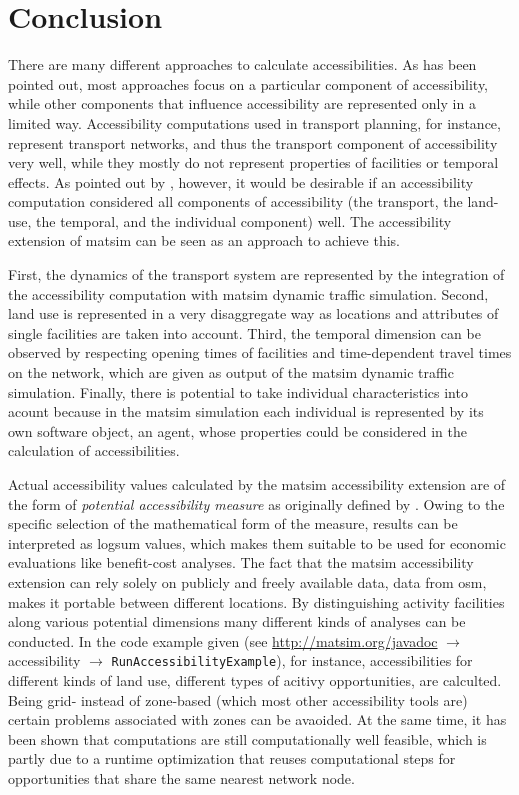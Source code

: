 \section{Conclusion}
There are many different approaches to calculate accessibilities. As has been pointed out, most approaches focus
on a particular component of accessibility, while other components that influence accessibility are 
represented only in a limited way. Accessibility computations used in transport planning, for instance, represent 
transport networks, and thus the transport component of accessibility very well, while they mostly do not represent
properties of facilities or temporal effects. As pointed out by \citet{Geurs2004AccessibilityReview}, however, it
would be desirable if an accessibility computation considered all components of accessibility (\ie the transport, 
the land-use, the temporal, and the individual component) well. The accessibility extension of \gls{matsim} can 
be seen as an approach to achieve this. 

First, the dynamics of the transport system are represented by the integration of the accessibility 
computation with \gls{matsim} dynamic traffic simulation. 
Second, land use is represented in a very disaggregate way as locations and attributes of single facilities are
taken into account.
Third, the temporal dimension can be observed by respecting opening times of facilities and time-dependent
travel times on the network, which are given as output of the \gls{matsim} dynamic traffic simulation.
Finally, there is potential to take individual characteristics into acount because in the \gls{matsim} simulation 
each individual is represented by its own software object, \ie an agent, whose properties could be
considered in the calculation of accessibilities.

Actual accessibility values calculated by the \gls{matsim} accessibility extension are of the form of 
\textit{potential accessibility measure} as originally defined by \citet{Hansen1959HowAccessibilityShapesLandUse}.
Owing to the specific selection of the mathematical form of the measure, results can be interpreted as 
\gls{logsum} values, which makes them suitable to be used for economic evaluations like benefit-cost analyses.
The fact that the \gls{matsim} accessibility extension can rely solely on publicly and freely available 
data, \eg data from \gls{osm}, makes it portable between different locations. By distinguishing activity facilities 
along various potential dimensions many different kinds of analyses can be conducted. In the code example given
(see \url{http://matsim.org/javadoc} $\to$ accessibility $\to$ \lstinline{RunAccessibilityExample}), for instance,
accessibilities for different kinds of land use, \ie different types of acitivy opportunities, are calculted.
Being grid- instead of zone-based (which most other accessibility tools are) certain problems associated with 
zones can be avaoided. At the same time, it has been shown that computations are still computationally well
feasible, which is partly due to a runtime optimization that reuses computational steps for opportunities that 
share the same nearest network node.


